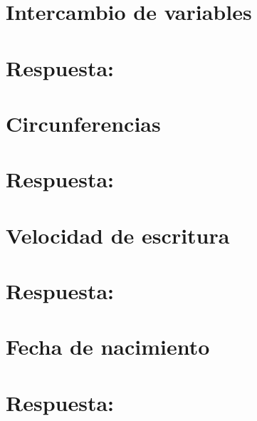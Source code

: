 \section{Intercambio de variables}

\ifshowanswers
\section*{Respuesta:}

\fi

\section{Circunferencias}

\ifshowanswers
\section*{Respuesta:}

\fi

\section{Velocidad de escritura}

\ifshowanswers
\section*{Respuesta:}

\fi

\section{Fecha de nacimiento}

\ifshowanswers
\section*{Respuesta:}

\fi
